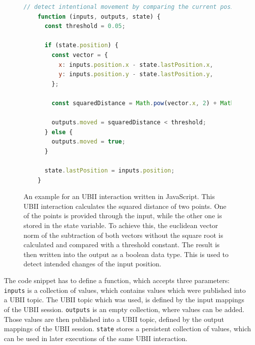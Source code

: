 \begin{figure}[H]
  \begin{lstlisting}[language=JavaScript]
    // detect intentional movement by comparing the current position with a previous one
    function (inputs, outputs, state) {
      const threshold = 0.05;

      if (state.position) {
        const vector = {
          x: inputs.position.x - state.lastPosition.x,
          y: inputs.position.y - state.lastPosition.y,
        };
  
        const squaredDistance = Math.pow(vector.x, 2) + Math.pow(vector.y, 2);
  
        outputs.moved = squaredDistance < threshold;
      } else {
        outputs.moved = true;
      }

      state.lastPosition = inputs.position;
    }
  \end{lstlisting}
  \caption[Basic UBII interaction in JavaScript]{An example for an \ac{UBII} interaction written in JavaScript. This \ac{UBII} interaction calculates the squared distance of two points. One of the points is provided through the input, while the other one is stored in the state variable. To achieve this, the euclidean vector norm of the subtraction of both vectors without the square root is calculated and compared with a threshold constant. The result is then written into the output as a boolean data type. This is used to detect intended changes of the input position.}\label{fig:ubii-interaction-example} %
\end{figure}

The code snippet has to define a function, which accepts three parameters: 
\lstinline{inputs} is a collection of values, which contains values which were published into a \ac{UBII} topic. The \ac{UBII} topic which was used, is defined by the input mappings of the \ac{UBII} session. \lstinline{outputs} is an empty collection, where values can be added. Those values are then published into a \ac{UBII} topic, defined by the output mappings of the \ac{UBII} session. \lstinline{state} stores a persistent collection of values, which can be used in later executions of the same \ac{UBII} interaction.